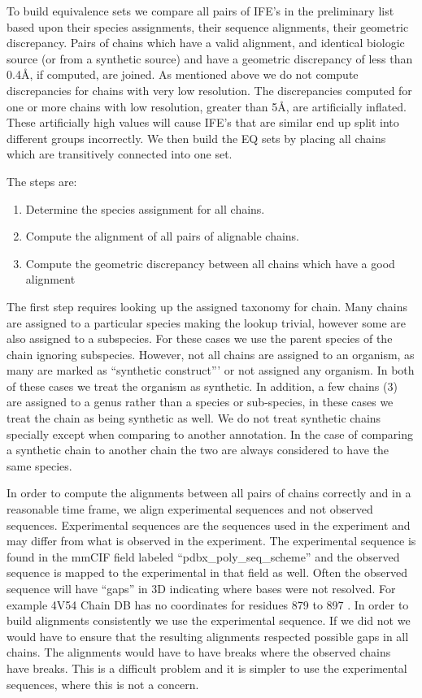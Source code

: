 To build equivalence sets we compare all pairs of IFE's in the preliminary list
based upon their species assignments, their sequence alignments, their geometric
discrepancy. Pairs of chains which have a valid alignment, and identical
biologic source (or from a synthetic source) and have a geometric discrepancy of less than
0.4{\AA}, if computed, are joined. As mentioned above we do not compute
discrepancies for chains with very low resolution. The discrepancies computed
for one or more chains with low resolution, greater than 5{\AA}, are artificially
inflated. These artificially high values will cause IFE's that are similar end
up split into different groups incorrectly. We then build the EQ sets by placing
all chains which are transitively connected into one set. 

The steps are:
\begin{enumerate}
  \item Determine the species assignment for all chains.
  \item Compute the alignment of all pairs of alignable chains.
  \item Compute the geometric discrepancy between all chains which have a good alignment
\end{enumerate}

The first step requires looking up the assigned taxonomy for chain. Many chains
are assigned to a particular species making the lookup trivial, however some are
also assigned to a subspecies. For these cases we use the parent species of the
chain ignoring subspecies. However, not all chains are assigned to an organism,
as many are marked as ``synthetic construct''' or not assigned any organism. In
both of these cases we treat the organism as synthetic. In addition, a few
chains (3) are assigned to a genus rather than a species or sub-species, in
these cases we treat the chain as being synthetic as well. We do not treat
synthetic chains specially except when comparing to another annotation. In the
case of comparing a synthetic chain to another chain the two are always
considered to have the same species.

In order to compute the alignments between all pairs of chains correctly and in
a reasonable time frame, we align experimental sequences and not observed
sequences. Experimental sequences are the sequences used in the experiment and
may differ from what is observed in the experiment. The experimental sequence is
found in the mmCIF field labeled ``pdbx\_poly\_seq\_scheme'' and the observed
sequence is mapped to the experimental in that field as well. Often the observed
sequence will have ``gaps'' in 3D indicating where bases were not resolved. For
example 4V54  Chain DB has no coordinates for residues 879 to 897
\cite{Borovinskaya2007a}. In order to build alignments consistently we use the
experimental sequence. If we did not we would have to ensure that the resulting
alignments respected possible gaps in all chains. The alignments would  have to have
breaks where the observed chains have breaks. This is a difficult problem and it
is simpler to use the experimental sequences, where this is not a concern.

